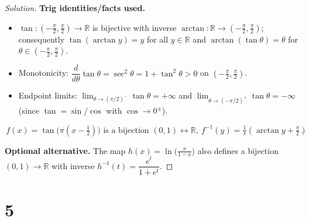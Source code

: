 \documentclass[12pt,a4paper]{article}
\theoremstyle{definition}
\theoremstyle{remark}
\newenvironment{solution}{\begin{proof}[Solution]}{\end{proof}}
\begin{document}
\begin{solution}
\textbf{Trig identities/facts used.}
\begin{itemize}[nosep]
    \item $\tan:(-\tfrac{\pi}{2},\tfrac{\pi}{2})\to\mathbb{R}$ is bijective with inverse $\arctan:\mathbb{R}\to(-\tfrac{\pi}{2},\tfrac{\pi}{2})$; consequently $\tan(\arctan y)=y$ for all $y\in\mathbb{R}$ and $\arctan(\tan\theta)=\theta$ for $\theta\in(-\tfrac{\pi}{2},\tfrac{\pi}{2})$.
    \item Monotonicity: $\dfrac{d}{d\theta}\tan\theta=\sec^2\theta=1+\tan^2\theta>0$ on $(-\tfrac{\pi}{2},\tfrac{\pi}{2})$.
    \item Endpoint limits: $\lim_{\theta\to(\pi/2)^-}\tan\theta=+\infty$ and $\lim_{\theta\to(-\pi/2)^+}\tan\theta=-\infty$ (since $\tan=\sin/\cos$ with $\cos\to 0^\pm$).
\end{itemize}
\[
\boxed{\,f(x)=\tan\bigl(\pi(x-\tfrac{1}{2})\bigr)\text{ is a bijection }(0,1)\leftrightarrow\mathbb{R},\ f^{-1}(y)=\tfrac{1}{\pi}(\arctan y+\tfrac{\pi}{2})\,}\,.
\]

\textbf{Optional alternative.} The map $h(x)=\ln\!\bigl(\tfrac{x}{1-x}\bigr)$ also defines a bijection $(0,1)\to\mathbb{R}$ with inverse $h^{-1}(t)=\dfrac{e^t}{1+e^t}$.
\end{solution}

\section*{5}
\end{document}
